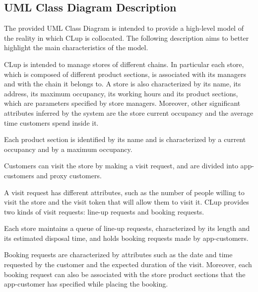 \documentclass[a4paper,oneside,11pt]{book}   %
\begin{document}
    \subsection{UML Class Diagram Description}
    The provided UML Class Diagram is intended to provide a high-level model of the reality in which CLup is collocated. The following description aims to better highlight the main characteristics of the model. \par
    CLup is intended to manage stores of different chains. In particular each store, which is composed of different product sections, is associated with its managers and with the chain it belongs to. A store is also characterized by its name, its address, its maximum occupancy, its working hours and its product sections, which are parameters specified by store managers. Moreover, other significant attributes inferred by the system are the store current occupancy and the average time customers spend inside it.  \par
    Each product section is identified by its name and is characterized by a current occupancy and by a maximum occupancy. \par
    Customers can visit the store by making a visit request, and are divided into app-customers and proxy customers. \par
    A visit request has different attributes, such as the number of people willing to visit the store and the visit token that will allow them to visit it. CLup provides two kinds of visit requests: line-up requests and booking requests. \par
    Each store maintains a queue of line-up requests, characterized by its length and its estimated disposal time, and holds booking requests made by app-customers. \par
    Booking requests are characterized by attributes such as the date and time requested by the customer and the expected duration of the visit. Moreover, each booking request can also be associated with the store product sections that the app-customer has specified while placing the booking.
\end{document}
